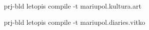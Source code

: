  
 
 
 
 

prj-bld letopis compile -t mariupol.kultura.art

prj-bld letopis compile -t mariupol.diaries.vitko

